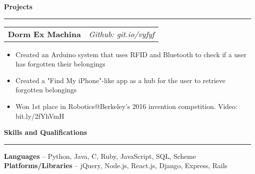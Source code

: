 \documentclass[11pt,letterpaper]{article}
\makeatletter
\newenvironment{topic}[1]
    {
    {\Large \centerline{#1}}
    \vspace*{0.03in}
    \hrule 
    \vspace*{0.05in}
    }
    {}
\newenvironment{event}
    {
    \begin{tabular*}{\textwidth}{l@{\extracolsep{\fill}}r}
    }
    {
    \end{tabular*}
    }
\newenvironment{detail}
    {
    \normalsize
    }
    {
    \vspace*{0.02in}
    }
\makeatother
\begin{document}
\begin{topic}{\textbf{Projects}}
        \begin{event}
            \textbf{Dorm Ex Machina} & \emph{Github: git.io/vyfyf}
        \end{event}
            \begin{itemize}
                \item Created an Arduino system that uses RFID and Bluetooth to check if a user has forgotten their belongings
                \item Created a "Find My iPhone"-like app as a hub for the user to retrieve forgotten belongings
                \item Won 1st place in Robotics@Berkeley's 2016 invention competition. Video: bit.ly/2fYhVmH
            \end{itemize}
        
    \end{topic} \vspace*{0.1in}










    \begin{topic}{\textbf{Skills and Qualifications}}
        \begin{detail}
            \textbf{Languages} -- Python, Java, C, Ruby, JavaScript, SQL, Scheme \\
            \textbf{Platforms/Libraries} -- jQuery, Node.js, React.js, Django, Express, Rails
        \end{detail}
    \end{topic}
\end{document}
